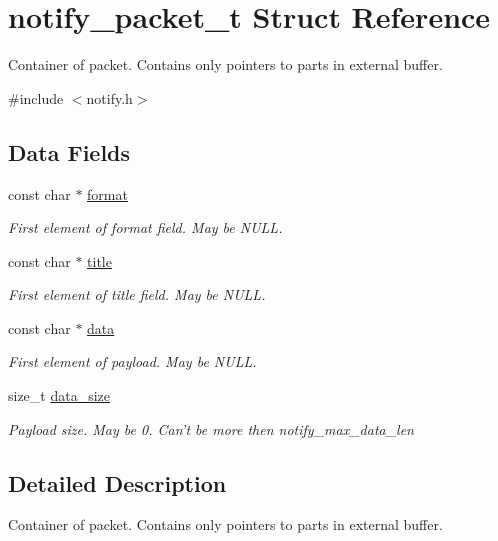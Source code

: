 \hypertarget{structnotify__packet__t}{\section{notify\-\_\-packet\-\_\-t Struct Reference}
\label{structnotify__packet__t}
}


Container of packet. Contains only pointers to parts in external buffer.  




{\ttfamily \#include $<$notify.\-h$>$}

\subsection*{Data Fields}
\begin{DoxyCompactItemize}
\item 
const char $\ast$ \hyperlink{structnotify__packet__t_a6bce6c2919cb2d7cceb74b024a52fe6f}{format}
\begin{DoxyCompactList}\small\item\em First element of {\ttfamily format} field. May be N\-U\-L\-L. \end{DoxyCompactList}\item 
const char $\ast$ \hyperlink{structnotify__packet__t_ad011adac6f55a105fcb8fd21823c98dd}{title}
\begin{DoxyCompactList}\small\item\em First element of {\ttfamily title} field. May be N\-U\-L\-L. \end{DoxyCompactList}\item 
const char $\ast$ \hyperlink{structnotify__packet__t_ac51484fff834e9d17d734627fcfc21b4}{data}
\begin{DoxyCompactList}\small\item\em First element of payload. May be N\-U\-L\-L. \end{DoxyCompactList}\item 
size\-\_\-t \hyperlink{structnotify__packet__t_af6ee9fc97f52935b9c4887b856d115e8}{data\-\_\-size}
\begin{DoxyCompactList}\small\item\em Payload size. May be 0. Can't be more then {\ttfamily notify\-\_\-max\-\_\-data\-\_\-len} \end{DoxyCompactList}\end{DoxyCompactItemize}


\subsection{Detailed Description}
Container of packet. Contains only pointers to parts in external buffer. 


